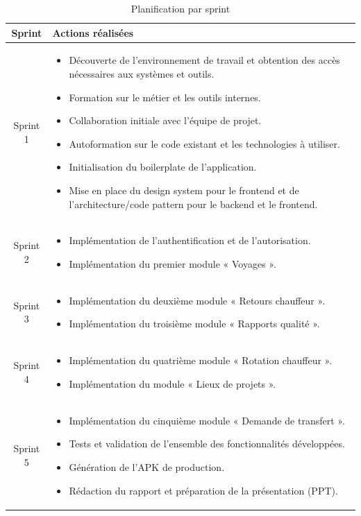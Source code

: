 \documentclass[12pt,a4paper]{article}
\begin{document}
{    \begin{table}[h]
    \centering
    \renewcommand{\arraystretch}{1.4}
    \caption{Planification par sprint}
    \label{tab:sprint-planning}
    \begin{tabular}{|c|p{13cm}|}
    \hline
    \textbf{Sprint} & \textbf{Actions réalisées} \\
    \hline
    Sprint 1 &
    \begin{itemize}[leftmargin=1.2em]
    \item Découverte de l'environnement de travail et obtention des accès nécessaires aux systèmes et outils.
    \item Formation sur le métier et les outils internes.
    \item Collaboration initiale avec l'équipe de projet.
    \item Autoformation sur le code existant et les technologies à utiliser.
    \item Initialisation du boilerplate de l'application.
    \item Mise en place du design system pour le frontend et de l'architecture/code pattern pour le backend et le frontend.
    \end{itemize}
    \\
    \hline
    Sprint 2 &
    \begin{itemize}[leftmargin=1.2em]
    \item Implémentation de l'authentification et de l'autorisation.
    \item Implémentation du premier module « Voyages ».
    \end{itemize}
    \\
    \hline
    Sprint 3 &
    \begin{itemize}[leftmargin=1.2em]
    \item Implémentation du deuxième module « Retours chauffeur ».
    \item Implémentation du troisième module « Rapports qualité ».
    \end{itemize}
    \\
    \hline
    Sprint 4 &
    \begin{itemize}[leftmargin=1.2em]
    \item Implémentation du quatrième module « Rotation chauffeur ».
    \item Implémentation du module « Lieux de projets ».
    \end{itemize}
    \\
    \hline
    Sprint 5 &
    \begin{itemize}[leftmargin=1.2em]
    \item Implémentation du cinquième module « Demande de transfert ».
    \item Tests et validation de l'ensemble des fonctionnalités développées.
    \item Génération de l'APK de production.
    \item Rédaction du rapport et préparation de la présentation (PPT).
    \end{itemize}
    \\
    \hline
    \end{tabular}
    \end{table}

}
\end{document}
